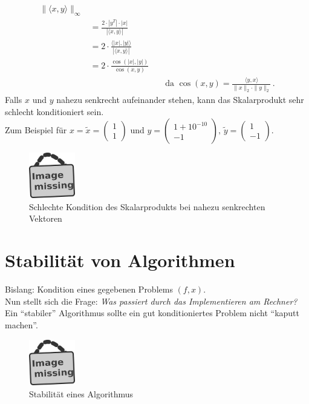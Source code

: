\documentclass[ngerman,fontsize=11pt, paper=a4, parskip=half, titlepage=true, toc=bib]{scrbook}
\newcommand{\sectione}[1]{\section{#1} \setcounter{equation}{0}}
\begin{document}
\begin{enumerate}[a)]
\begin{align*}
																{\|\langle x,y\rangle\|_\infty}\\
												&= \frac{2\cdot |y^T|\cdot |x|}{|\langle x,y\rangle|} \\
												&= 2\cdot \frac{\langle |x|,|y|\rangle}{|\langle x,y\rangle|} \\
												&= 2 \cdot \frac{\cos(|x|, |y|)}{\cos(x,y)}  \\
	&&&				\text{	da  }\cos(x,y) = \frac{\langle y,x \rangle}{\|x\|_2 \cdot \|y\|_2} \, . 
				\end{align*}
				Falls $x$ und $y$ nahezu senkrecht aufeinander stehen, kann das Skalarprodukt sehr schlecht konditioniert sein. \\
				Zum Beispiel für $x=\widetilde{x} = \begin{pmatrix} 1 \\1 \end{pmatrix}$
					 und $y=\begin{pmatrix} 1+10^{-10} \\-1 \end{pmatrix},
					  \, \widetilde{y}=\begin{pmatrix} 1 \\-1 \end{pmatrix}$. \\
					  \begin{figure}
					  	\parbox{\linewidth}{
					  		\centering
					  		\includegraphics[width=2cm]{images/image_missing.jpg}
					  	}
					  	\caption{Schlechte Kondition des Skalarprodukts bei nahezu senkrechten Vektoren}
					  \end{figure}
\end{enumerate}

\sectione{Stabilität von Algorithmen}
Bislang: Kondition eines gegebenen Problems $(f,x)$. \\
Nun stellt sich die Frage: \textit{Was passiert durch das Implementieren am Rechner? }\\
Ein \enquote{stabiler} Algorithmus sollte ein gut konditioniertes Problem nicht \enquote{kaputt machen}.\\

	  \begin{figure}
	  	\parbox{\linewidth}{
	  		\centering
	  		\includegraphics[width=2cm]{images/image_missing.jpg}
	  	}
	  	\caption{Stabilität eines Algorithmus}
	  \end{figure}
\end{document}
